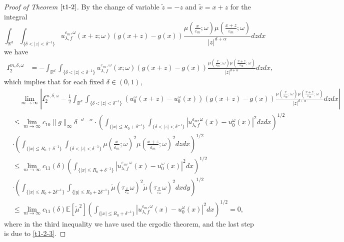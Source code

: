 \documentclass[11pt,draft, reqno]{amsart}
\renewcommand{\le}{\leqslant}
\newcommand{\R}{\mathds R}
\newcommand{\e}{\varepsilon}
\newcommand{\Ee}{\mathds E}
\newcommand{\w}{\omega}
\theoremstyle{definition}
\numberwithin{equation}{section}
\begin{document}
\begin{proof} [Proof of Theorem $\ref{t1-2}$]
By the change of variable $\tilde z=-z$ and $\tilde x=x+z$ for the integral
$$\int_{\R^d}\int_{\{\delta<|z|<\delta^{-1}\}}u_{\lambda,f}^{\e_m,\w}\left(x+z;\w\right)\left(g(x+z)-g(x)\right)
\frac{\mu\left(\frac{x}{\e_m};\w\right)\mu\left(\frac{x+z}{\e_m};\w\right)}{|z|^{d+\alpha}}dzdx$$
we have
\begin{align*}
I_2^{m,\delta,\w}&=-\int_{\R^d}\int_{\{\delta<|z|<\delta^{-1}\}}
u_{\lambda,f}^{\e_m,\w}\left(x;\w\right)\left(g(x+z)-g(x)\right)
\frac{\mu\left(\frac{x}{\e_m};\w\right)\mu\left(\frac{x+z}{\e_m};\w\right)}{|z|^{d+\alpha}}dzdx,
\end{align*}
which implies that for each fixed $\delta\in (0,1)$,
\begin{align*}
&\quad \lim_{m \to \infty}\left|I_2^{m,\delta,\w}-\frac{1}{2}\int_{\R^d}\int_{\{\delta<|z|<\delta^{-1}\}}
\left(u_{0}^{\w}(x+z)-u_0^\w(x)\right)\left(g(x+z)-g(x)\right)
\frac{\mu\left(\frac{x}{\e_m};\w\right)\mu\left(\frac{x+z}{\e_m};\w\right)}{|z|^{d+\alpha}}dzdx\right|\\
&\le \lim_{m \to \infty}c_{10}\|g\|_\infty\delta^{-d-\alpha}\cdot
\left(\int_{\{|x|\le R_0+\delta^{-1}\}}\int_{\{\delta<|z|<\delta^{-1}\}}\left|u_{\lambda,f}^{\e_m,\w}\left(x\right)-u_0^\w(x)\right|^2dzdx\right)^{1/2}\\
&\cdot \left(\int_{\{|x|\le R_0+\delta^{-1}\}}\int_{\{\delta<|z|<\delta^{-1}\}}\mu\left(\frac{x}{\e_m};\w\right)^2
\mu\left(\frac{x+z}{\e_m};\w\right)^2 dzdx\right)^{1/2}\\
&\le \lim_{m \to \infty}c_{11}(\delta)
\left(\int_{\{|x|\le R_0+\delta^{-1}\}}\left|u_{\lambda,f}^{\e_m,\w}\left(x\right)-u_0^\w(x)\right|^2dx\right)^{1/2}\\
&\cdot \left(\int_{\{|x|\le R_0+2\delta^{-1}\}}\int_{\{|y|\le R_0+2\delta^{-1}\}}\tilde \mu\left(\tau_{\frac{x}{\e_m}}\w\right)^2
\tilde \mu\left(\tau_{\frac{y}{\e_m}}\w\right)^2 dxdy\right)^{1/2}\\
&\le \lim_{m \to \infty}c_{11}(\delta)\Ee[\tilde \mu^2]\left(\int_{\{|x|\le R_0+\delta^{-1}\}}\left|u_{\lambda,f}^{\e_m,\w}\left(x\right)-u_0^\w(x)\right|^2dx\right)^{1/2}=0,
\end{align*}
where in the third inequality we have used the ergodic theorem, and the last step is due to \eqref{t1-2-3}.


\end{proof}
\end{document}
